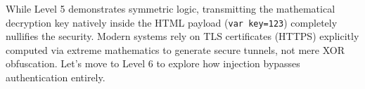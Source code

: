 \begin{takeawaybox}
While Level 5 demonstrates symmetric logic, transmitting the mathematical decryption key natively inside the HTML payload (\texttt{var key=123}) completely nullifies the security. Modern systems rely on TLS certificates (HTTPS) explicitly computed via extreme mathematics to generate secure tunnels, not mere XOR obfuscation. Let's move to Level 6 to explore how injection bypasses authentication entirely.
\end{takeawaybox}

